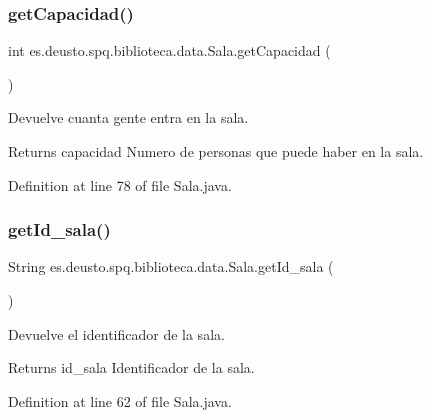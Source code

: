 \subsubsection{\texorpdfstring{get\+Capacidad()}{getCapacidad()}}
{\footnotesize\ttfamily int es.\+deusto.\+spq.\+biblioteca.\+data.\+Sala.\+get\+Capacidad (\begin{DoxyParamCaption}{ }\end{DoxyParamCaption})}

Devuelve cuanta gente entra en la sala. \begin{DoxyReturn}{Returns}
capacidad Numero de personas que puede haber en la sala. 
\end{DoxyReturn}


Definition at line 78 of file Sala.\+java.

\mbox{\label{classes_1_1deusto_1_1spq_1_1biblioteca_1_1data_1_1_sala_ad24b42d5a886015aeed4eedfb9eab26e}} 
\subsubsection{\texorpdfstring{get\+Id\+\_\+sala()}{getId\_sala()}}
{\footnotesize\ttfamily String es.\+deusto.\+spq.\+biblioteca.\+data.\+Sala.\+get\+Id\+\_\+sala (\begin{DoxyParamCaption}{ }\end{DoxyParamCaption})}

Devuelve el identificador de la sala. \begin{DoxyReturn}{Returns}
id\+\_\+sala Identificador de la sala. 
\end{DoxyReturn}


Definition at line 62 of file Sala.\+java.

